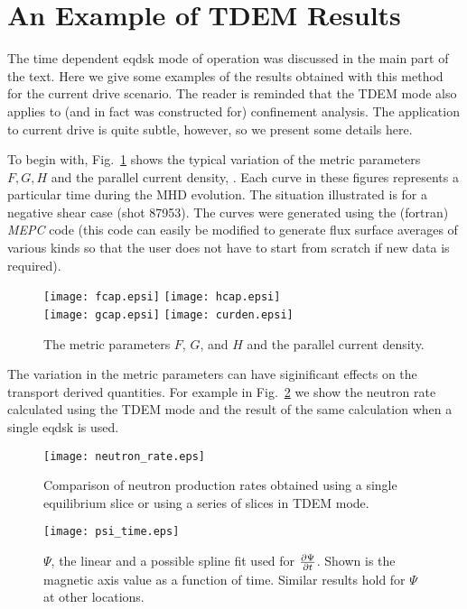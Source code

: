 \section{An Example of TDEM Results}

The time dependent eqdsk mode of operation was discussed in the main part of the
text. Here we give some examples of the results obtained with this method for
the current drive scenario. The reader is reminded that the TDEM mode also
applies to (and in fact was constructed for) confinement analysis. The
application to current drive is quite subtle, however, so we present some 
details here. 

To begin with, Fig.~\ref{fig:TDEM1} shows the typical variation of the metric
parameters $ F,G,H $ and the parallel current density, .
Each curve in these figures represents a particular time during
the MHD evolution. The situation illustrated is for a negative
shear case (shot 87953). The curves were generated using the 
(fortran) \emph{MEPC} code (this code can easily be modified to generate
flux surface averages of various kinds so that the user does not
have to start from scratch if new data is required).

\begin{figure}
 \centering
 \texttt{[image: fcap.epsi]}
 \texttt{[image: hcap.epsi]}\\[.35in]
 \texttt{[image: gcap.epsi]}
 \texttt{[image: curden.epsi]}
 \caption{The metric parameters $F$, $G$, and $H$ and the parallel current
 density.}
 \label{fig:TDEM1}
\end{figure}

The variation in the metric parameters can have siginificant effects on the
transport derived quantities. For example in Fig.~\ref{fig:TDEMneut} we show the
neutron rate calculated using the TDEM mode and the result of the same
calculation when a single eqdsk is used.
\begin{figure}
 \centering
 \texttt{[image: neutron\_rate.eps]}
 \caption{Comparison of neutron production rates obtained using a single
 equilibrium slice or using a series of slices in TDEM
 mode.\label{fig:TDEMneut}}
\end{figure}

\begin{figure}
 \centering
 \texttt{[image: psi\_time.eps]}
 \caption{$\Psi$, the linear and a possible spline fit used for
 $\frac{\partial{ \Psi}}{\partial{ t}} $.  Shown is the magnetic axis value as a function of time.
Similar results hold for $\Psi $ at other locations.}
\end{figure}

